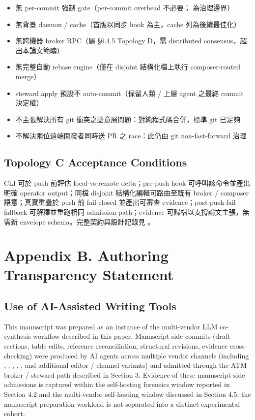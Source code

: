 \documentclass[a4paper,fontset=none]{ctexart}
\begin{document}
\begin{itemize}
\item 無 per-commit 強制 gate（per-commit overhead 不必要；\texttt{} 為治理邊界）
\item 無背景 daemon / cache（首版以同步 hook 為主，cache 列為後續最佳化）
\item 無跨機器 broker RPC（屬 §6.4.5 Topology D，需 distributed consensus，超出本論文範疇）
\item 無完整自動 rebase engine（僅在 disjoint 結構化檔上執行 composer-routed merge）
\item steward apply 預設不 auto-commit（保留人類 / 上層 agent 之最終 commit 決定權）
\item 不主張解決所有 git 衝突之語意層問題：對純程式碼合併，標準 git \texttt{} 已足夠
\item 不解決兩位遠端開發者同時送 PR 之 race：此仍由 git non-fast-forward 治理
\end{itemize}

\subsection*{Topology C Acceptance Conditions}

\texttt{} CLI 可於 push 前評估 local-vs-remote delta；pre-push hook 可呼叫該命令並產出明確 operator output；同檔 disjoint 結構化編輯可路由至既有 broker / composer 語意；真實重疊於 push 前 fail-closed 並產出可審查 evidence；post-push-fail fallback 可解釋並重跑相同 admission path；evidence 可歸檔以支撐論文主張，無需新 envelope schema。完整契約與設計記錄見 \texttt{}。

\medskip



\section*{Appendix B. Authoring Transparency Statement}

\subsection*{Use of AI-Assisted Writing Tools}

This manuscript was prepared as an instance of the multi-vendor LLM co-synthesis workflow described in this paper. Manuscript-side commits (draft sections, table edits, reference reconciliation, structural revisions, evidence cross-checking) were produced by AI agents across multiple vendor channels (including \texttt{}, \texttt{}, \texttt{}, \texttt{}, \texttt{}, and additional editor / channel variants) and admitted through the ATM broker / steward path described in Section 3. Evidence of these manuscript-side admissions is captured within the self-hosting forensics window reported in Section 4.2 and the multi-vendor self-hosting window discussed in Section 4.5; the manuscript-preparation workload is not separated into a distinct experimental cohort.
\end{document}
